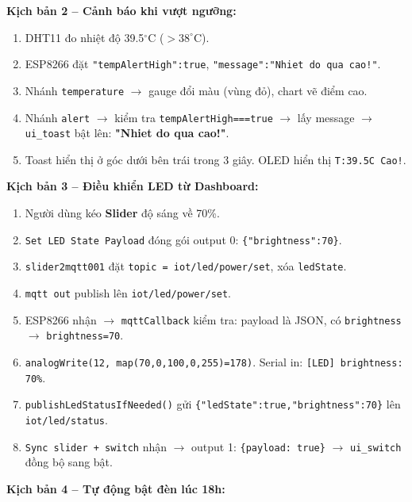\documentclass[13pt,a4paper]{article}
\newcommand{\code}[1]{\texttt{#1}}
\begin{document}
\textbf{Kịch bản 2 -- Cảnh báo khi vượt ngưỡng:}

\begin{enumerate}[label=\arabic*., leftmargin=1.5cm]
    \item DHT11 đo nhiệt độ 39.5$^\circ$C ($> 38^\circ$C).
    \item ESP8266 đặt \code{"tempAlertHigh":true}, \code{"message":"Nhiet do qua cao!"}.
    \item Nhánh \code{temperature} $\rightarrow$ gauge đổi màu (vùng đỏ), chart vẽ điểm cao.
    \item Nhánh \code{alert} $\rightarrow$ kiểm tra \code{tempAlertHigh===true} $\rightarrow$ lấy message $\rightarrow$ \code{ui\_toast} bật lên: \textbf{"Nhiet do qua cao!"}.
    \item Toast hiển thị ở góc dưới bên trái trong 3 giây. OLED hiển thị \code{T:39.5C Cao!}.
\end{enumerate}

\textbf{Kịch bản 3 -- Điều khiển LED từ Dashboard:}

\begin{enumerate}[label=\arabic*., leftmargin=1.5cm]
    \item Người dùng kéo \textbf{Slider} độ sáng về 70\%.
    \item \code{Set LED State Payload} đóng gói output 0: \code{\{"brightness":70\}}.
    \item \code{slider2mqtt001} đặt \code{topic = iot/led/power/set}, xóa \code{ledState}.
    \item \code{mqtt out} publish lên \code{iot/led/power/set}.
    \item ESP8266 nhận $\rightarrow$ \code{mqttCallback} kiểm tra: payload là JSON, có \code{brightness} $\rightarrow$ \code{brightness=70}.
    \item \code{analogWrite(12, map(70,0,100,0,255)=178)}. Serial in: \code{[LED] brightness: 70\%}.
    \item \code{publishLedStatusIfNeeded()} gửi \code{\{"ledState":true,"brightness":70\}} lên \code{iot/led/status}.
    \item \code{Sync slider + switch} nhận $\rightarrow$ output 1: \code{\{payload: true\}} $\rightarrow$ \code{ui\_switch} đồng bộ sang bật.
\end{enumerate}

\textbf{Kịch bản 4 -- Tự động bật đèn lúc 18h:}
\end{document}

